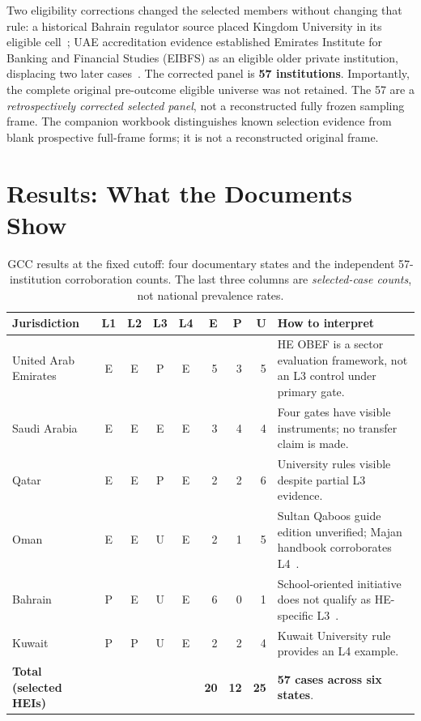 \documentclass[conference,letterpaper]{IEEEtran}
\begin{document}
Two eligibility corrections changed the selected members without changing that rule: a historical Bahrain regulator source placed Kingdom University in its eligible cell~\cite{bqa1,bqa2}; UAE accreditation evidence established Emirates Institute for Banking and Financial Studies (EIBFS) as an eligible older private institution, displacing two later cases~\cite{caa1,caa2}. The corrected panel is \textbf{57 institutions}. Importantly, the complete original pre-outcome eligible universe was not retained. The 57 are a \emph{retrospectively corrected selected panel}, not a reconstructed fully frozen sampling frame. The companion workbook distinguishes known selection evidence from blank prospective full-frame forms; it is not a reconstructed original frame.

\section{Results: What the Documents Show}
\begin{table}[t]
\centering\caption{GCC results at the fixed cutoff: four documentary states and the independent 57-institution corroboration counts. The last three columns are \emph{selected-case counts}, not national prevalence rates.}
\label{tab:core}\small
\setlength{\tabcolsep}{6pt}
\begin{tabularx}{\textwidth}{@{}p{}ccccrrrX@{}}
\toprule
Jurisdiction & L1 & L2 & L3 & L4 & E & P & U & How to interpret\tabularnewline\midrule
United Arab Emirates & E & E & P & E & 5 & 3 & 5 & HE OBEF is a sector evaluation framework, not an L3 control under primary gate.\tabularnewline
Saudi Arabia & E & E & E & E & 3 & 4 & 4 & Four gates have visible instruments; no transfer claim is made.\tabularnewline
Qatar & E & E & P & E & 2 & 2 & 6 & University rules visible despite partial L3 evidence.\tabularnewline
Oman & E & E & U & E & 2 & 1 & 5 & Sultan Qaboos guide edition unverified; Majan handbook corroborates L4~\cite{squ,majanhb}.\tabularnewline
Bahrain & P & E & U & E & 6 & 0 & 1 & School-oriented initiative does not qualify as HE-specific L3~\cite{bahrain}.\tabularnewline
Kuwait & P & P & U & E & 2 & 2 & 4 & Kuwait University rule provides an L4 example.\tabularnewline\midrule
\textbf{Total (selected HEIs)} & & & & & \textbf{20} & \textbf{12} & \textbf{25} & \textbf{57 cases across six states}.\tabularnewline\bottomrule
\end{tabularx}
\end{table}
\end{document}
